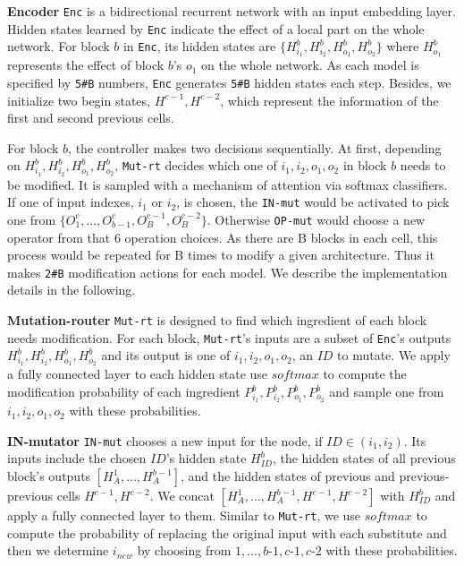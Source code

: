 \documentclass[10pt,twocolumn,letterpaper]{article}
\begin{document}
\noindent
\textbf{Encoder}\quad
\texttt{Enc} is a bidirectional recurrent network with an input embedding layer. 
Hidden states learned by \texttt{Enc} indicate the effect of a local part on the whole network.
For block $b$ in \texttt{Enc}, its hidden states are $\{H_{i_1}^b, H_{i_2}^b, H_{o_1}^b, H_{o_2}^b\}$ where $H_{o_1}^b$ represents the effect of block $b$'s $o_1$ on the whole network. As each model is specified by \texttt{5\#B} numbers, \texttt{Enc} generates \texttt{5\#B} hidden states each step. Besides, we initialize two begin states, $H^{c-1},H^{c-2}$, which represent the information of the first and second previous cells.

For block $b$, the controller makes two decisions sequentially. At first, depending on $H_{i_1}^b, H_{i_2}^b, H_{o_1}^b, H_{o_2}^b$, \texttt{Mut-rt} decides which one of $i_1, i_2, o_1, o_2$ in block $b$ needs to be modified. It is sampled with a mechanism of attention via softmax classifiers. If one of input indexes, $i_1$ or $i_2$, is chosen, the \texttt{IN-mut} would be activated to pick one from  $\{O_1^c, ... ,O_{b-1}^c,O_B^{c-1},O_B^{c-2}\}$. Otherwise \texttt{OP-mut} would choose a new operator from that 6 operation choices. As there are B blocks in each cell, this process would be repeated for B times to modify a given architecture. Thus it makes \texttt{2\#B} modification actions for each model. We describe the implementation details in the following.

\noindent
\textbf{Mutation-router}\quad
\texttt{Mut-rt} is designed to find which ingredient of each block needs modification. For each block, \texttt{Mut-rt}'s inputs are a subset of \texttt{Enc}'s outputs $H_{i_1}^b, H_{i_2}^b, H_{o_1}^b, H_{o_2}^b$ and its output is one of  $i_1, i_2, o_1, o_2$, an $ID$ to mutate. We apply a fully connected layer to each hidden state use $softmax$ to compute the modification probability of each ingredient $P_{i_1}^b, P_{i_2}^b, P_{o_1}^b, P_{o_2}^b$ and sample one from $i_1, i_2, o_1, o_2$ with these probabilities.

\noindent
\textbf{IN-mutator}\quad
\texttt{IN-mut} chooses a new input for the node, if $ID\in (i_1,i_2)$. Its inputs include the chosen $ID$'s hidden state $H_{ID}^b$, the hidden states of all previous block's outputs $[H_{A}^1,...,H_{A}^{b-1}]$, and the hidden states of previous and previous-previous cells $H^{c-1},H^{c-2}$. We concat $[H_{A}^1,...,H_{A}^{b-1},H^{c-1},H^{c-2}]$ with $H_{ID}^b$ and apply a fully connected layer to them. Similar to \texttt{Mut-rt}, we use $softmax$ to compute the probability of replacing the original input with each substitute and then we determine $i_{new}$ by choosing from $1, ... ,b$-$1, c$-$1, c$-$2$ with these probabilities.
\end{document}

